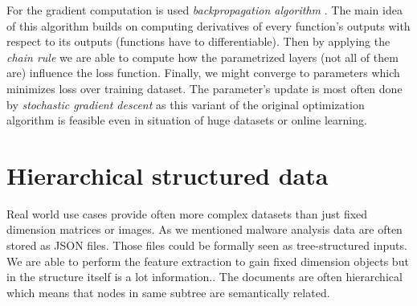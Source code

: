 For the gradient computation is used \emph{backpropagation algorithm} \cite{Rumelhart1988}. The main idea of this algorithm builds on computing derivatives of every function's outputs with respect to its outputs (functions have to differentiable). Then by applying the \emph{chain rule} we are able to compute how the parametrized layers (not all of them are) influence the loss function. Finally, we might converge to parameters which minimizes loss over training dataset. The parameter's update is most often done by \emph{stochastic gradient descent} \cite{Kiefer1952} as this variant of the original optimization algorithm is feasible even in situation of huge datasets or online learning.







\section{Hierarchical structured data}
Real world use cases provide often more complex datasets than just fixed dimension matrices or images. As we mentioned malware analysis data are often stored as JSON files. Those files could be formally seen as tree-structured inputs. We are able to perform the feature extraction to gain fixed dimension objects but in the structure itself is a lot information.\cite{PevnyDedic2020}.  The documents are often hierarchical which means that nodes in same subtree are semantically related. 

